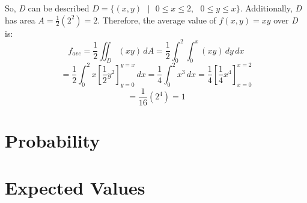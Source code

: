 \begin{Answer}[ref = avg]
\begin{enumerate}
So, \textit{D} can be described $\textit{D} = \{(x, y)\text{ }|\text{ }0 \leq 
x \leq 2,\text{ }0 \leq y \leq x\}$. Additionally, \textit{D} has area $A = 
\frac{1}{2} \left( 2^2 \right) = 2$. Therefore, the average value of $f(x,y) = 
xy$ over \textit{D} is:
$$f_{ave} = \frac{1}{2} \iint_{\textit{D}} \left(xy \right)\,dA = \frac{1}{2} 
\int_0^2 \int_0^x \left(xy \right)\,dy\,dx$$
$$= \frac{1}{2} \int_0^2 x \left[ \frac{1}{2}y^2 \right]_{y = 0}^{y = x}\,dx = 
\frac{1}{4} \int_0^2 x^3\,dx = \frac{1}{4} \left[ \frac{1}{4}x^4 \right]_{x = 0
}^{x = 2}$$
$$= \frac{1}{16} \left(2^4 \right) = 1$$
\end{enumerate}
\end{Answer}

\section{Probability}

\section{Expected Values}